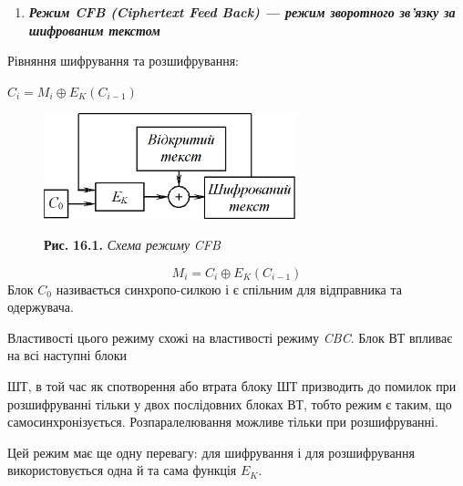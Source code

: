 \bigskip


\bigskip

\liststyleWWviiiNumxxi
\begin{enumerate}
\item {\centering\bfseries\itshape
Режим CFB (Ciphertext Feed Back) --- режим зворотного зв’язку за шифрованим
текстом
\par}
\end{enumerate}

\bigskip


\bigskip

Рівняння шифрування та розшифрування:

{\centering  ${C_{{i}}=M_{{i}}{\oplus}E_{{K}}(C_{{i-1}})}$\par}

\begin{figure}
\centering
\begin{minipage}{2.9866in}
 \includegraphics[width=2.8957in,height=1.2083in]{crypt-img/crypt-img337.png} 

{\centering
\textbf{Рис. }\textbf{16.}\textbf{1.} \textit{Схема режим}\textit{у}\textit{
}\textit{CFB}
\par}
\end{minipage}
\end{figure}
\begin{equation*}
{M_{{i}}=C_{{i}}{\oplus}E_{{K}}(C_{{i-1}})}
\end{equation*}
Блок  ${C_{{0}}}$ називається синхропо{}-силкою і є спільним для відправника та
одержувача.

Властивості цього режиму схожі на властивості режиму \textit{CBC}. Блок ВТ
впливає на всі наступні блоки 

ШТ, в той час як спотворення або втрата блоку ШТ призводить до помилок при
розшифруванні тільки у двох послідовних блоках ВТ, тобто режим є таким, що
самосинхронізується. Розпаралелювання можливе тільки при розшифруванні.

Цей режим має ще одну перевагу: для шифрування і для розшифрування
використовується одна й та сама функція  ${E_{{K}}}$.


\bigskip


\bigskip


